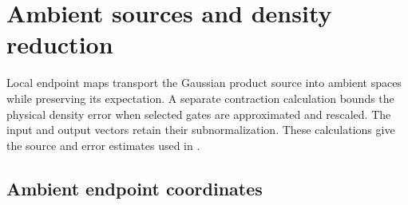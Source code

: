 
\section{Ambient sources and density reduction}\label{ch:source_reduction}

Local endpoint maps transport the Gaussian product source into ambient
spaces while preserving its expectation. A separate contraction calculation
bounds the physical density error when selected gates are approximated and
rescaled. The input and output vectors retain their subnormalization.
These calculations give the source and error estimates used in
\cite[Theorem~5.2]{OpenAI2026PolynomialPEPS}.

\subsection{Ambient endpoint coordinates}

